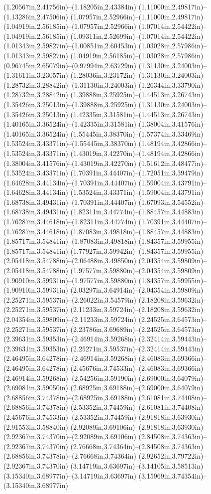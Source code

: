 (1.20567in,2.41756in)--(1.18205in,2.43384in) (1.11000in,2.49817in)--(1.13286in,2.47506in) (1.07957in,2.52966in)--(1.11000in,2.49817in) (1.04919in,2.56185in)--(1.07957in,2.52966in) (1.07014in,2.54422in)--(1.04919in,2.56185in) (1.09311in,2.52699in)--(1.07014in,2.54422in) (1.01343in,2.59827in)--(1.00851in,2.60453in) (1.03028in,2.57986in)--(1.01343in,2.59827in) (1.04919in,2.56185in)--(1.03028in,2.57986in) (0.96745in,2.65079in)--(0.97994in,2.63729in) (1.31130in,3.24003in)--(1.31611in,3.23057in) (1.28036in,3.23172in)--(1.31130in,3.24003in) (1.28732in,3.28842in)--(1.31130in,3.24003in) (1.26344in,3.33790in)--(1.28732in,3.28842in) (1.39888in,3.25925in)--(1.44513in,3.26743in) (1.35426in,3.25013in)--(1.39888in,3.25925in) (1.31130in,3.24003in)--(1.35426in,3.25013in) (1.42335in,3.31581in)--(1.44513in,3.26743in) (1.40165in,3.36524in)--(1.42335in,3.31581in) (1.38004in,3.41576in)--(1.40165in,3.36524in) (1.55445in,3.38370in)--(1.57374in,3.33469in) (1.53524in,3.43371in)--(1.55445in,3.38370in) (1.48194in,3.42866in)--(1.53524in,3.43371in) (1.43019in,3.42270in)--(1.48194in,3.42866in) (1.38004in,3.41576in)--(1.43019in,3.42270in) (1.51612in,3.48477in)--(1.53524in,3.43371in) (1.70391in,3.44407in)--(1.72051in,3.39479in) (1.64628in,3.44134in)--(1.70391in,3.44407in) (1.59004in,3.43791in)--(1.64628in,3.44134in) (1.53524in,3.43371in)--(1.59004in,3.43791in) (1.68738in,3.49431in)--(1.70391in,3.44407in) (1.67093in,3.54552in)--(1.68738in,3.49431in) (1.82311in,3.44774in)--(1.88457in,3.44883in) (1.76287in,3.44618in)--(1.82311in,3.44774in) (1.70391in,3.44407in)--(1.76287in,3.44618in) (1.87083in,3.49818in)--(1.88457in,3.44883in) (1.85717in,3.54841in)--(1.87083in,3.49818in) (1.84357in,3.59955in)--(1.85717in,3.54841in) (1.77927in,3.59942in)--(1.84357in,3.59955in) (2.05418in,3.54788in)--(2.06488in,3.49850in) (2.04354in,3.59809in)--(2.05418in,3.54788in) (1.97577in,3.59880in)--(2.04354in,3.59809in) (1.90910in,3.59931in)--(1.97577in,3.59880in) (1.84357in,3.59955in)--(1.90910in,3.59931in) (2.03297in,3.64914in)--(2.04354in,3.59809in) (2.25271in,3.59537in)--(2.26022in,3.54579in) (2.18208in,3.59632in)--(2.25271in,3.59537in) (2.11233in,3.59724in)--(2.18208in,3.59632in) (2.04354in,3.59809in)--(2.11233in,3.59724in) (2.24525in,3.64573in)--(2.25271in,3.59537in) (2.23786in,3.69689in)--(2.24525in,3.64573in) (2.39631in,3.59353in)--(2.46914in,3.59268in) (2.32414in,3.59443in)--(2.39631in,3.59353in) (2.25271in,3.59537in)--(2.32414in,3.59443in) (2.46495in,3.64278in)--(2.46914in,3.59268in) (2.46083in,3.69366in)--(2.46495in,3.64278in) (2.45676in,3.74533in)--(2.46083in,3.69366in) (2.46914in,3.59268in)--(2.54256in,3.59190in) (2.69000in,3.64079in)--(2.69081in,3.59050in) (2.68925in,3.69188in)--(2.69000in,3.64079in) (2.68856in,3.74378in)--(2.68925in,3.69188in) (2.61081in,3.74408in)--(2.68856in,3.74378in) (2.53352in,3.74459in)--(2.61081in,3.74408in) (2.45676in,3.74533in)--(2.53352in,3.74459in) (2.91818in,3.63930in)--(2.91553in,3.58840in) (2.92089in,3.69106in)--(2.91818in,3.63930in) (2.92367in,3.74370in)--(2.92089in,3.69106in) (2.84508in,3.74363in)--(2.92367in,3.74370in) (2.76668in,3.74364in)--(2.84508in,3.74363in) (2.68856in,3.74378in)--(2.76668in,3.74364in) (2.92652in,3.79722in)--(2.92367in,3.74370in) (3.14719in,3.63697in)--(3.14105in,3.58513in) (3.15340in,3.68977in)--(3.14719in,3.63697in) (3.15969in,3.74354in)--(3.15340in,3.68977in) 